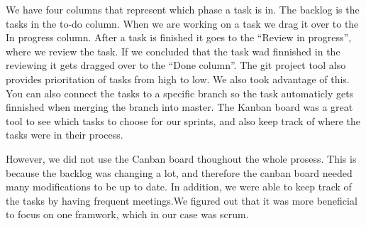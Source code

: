 We have four columns that represent which phase a task is in. The backlog is the tasks in the to-do column. When we are working on a task we drag it over to the In progress column. After a task is finished it goes to the “Review in progress”, where we review the task. If we concluded that the task wad finnished in the reviewing it gets dragged over to the “Done column”. The git project tool also provides prioritation of tasks from high to low. We also took advantage of this. You can also connect the tasks to a specific branch so the task automaticly gets finnished when merging the branch into master. The Kanban board was a great tool to see which tasks to choose for our sprints, and also keep track of where the tasks were in their process.

However, we did not use the Canban board thoughout the whole prosess. This is because the backlog was changing a lot, and therefore the canban board needed many modifications to be up to date. In addition, we were able to keep track of the tasks by having frequent meetings.We figured out that it was more beneficial to focus on one framwork, which in our case was scrum. 